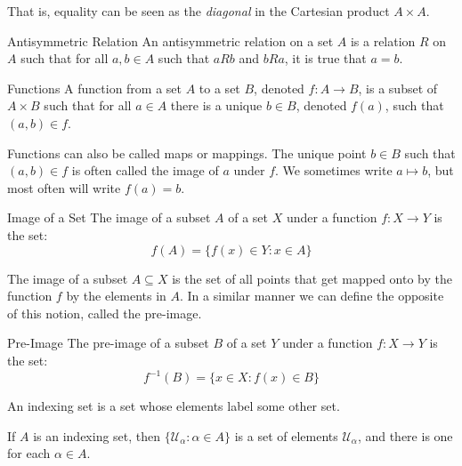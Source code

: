 \documentclass[crop=false,class=book,oneside]{standalone}
\begin{document}
        That is, equality can be seen as the \textit{diagonal} in the
        Cartesian product $A\times{A}$.
        \begin{ldefinition}{Antisymmetric Relation}
            An antisymmetric relation on a set $A$ is a relation $R$ on $A$
            such that for all $a,b\in{A}$ such that $aRb$ and $bRa$, it
            is true that $a=b$.
        \end{ldefinition}
        \begin{ldefinition}{Functions}
            A function from a set $A$ to a set $B$, denoted
            $f:A\rightarrow B$, is a subset of $A\times{B}$
            such that for all $a\in{A}$ there is a unique
            $b\in{B}$, denoted $f(a)$, such that $(a,b)\in{f}$.
        \end{ldefinition}
        Functions can also be called maps or mappings. The unique point
        $b\in{B}$ such that $(a,b)\in{f}$ is often called the image of
        $a$ under $f$. We sometimes write $a\mapsto{b}$, but most often
        will write $f(a)=b$.
        \begin{ldefinition}{Image of a Set}
            The image of a subset $A$ of a set $X$ under a function
            $f:X\rightarrow{Y}$ is the set:
            \begin{equation}
                f(A)=\{f(x)\in{Y}:x\in{A}\}
            \end{equation}
        \end{ldefinition}
        The image of a subset $A\subseteq{X}$ is the set of all points
        that get mapped onto by the function $f$ by the elements in $A$.
        In a similar manner we can define the opposite of this notion,
        called the pre-image.
        \begin{ldefinition}{Pre-Image}
            The pre-image of a subset $B$ of a set $Y$ under a function
            $f:X\rightarrow{Y}$ is the set:
            \begin{equation}
                f^{-1}(B)=\{x\in{X}:f(x)\in{B}\}
            \end{equation}
        \end{ldefinition}
        \begin{definition}
            An indexing set is a set whose elements label some other set.
        \end{definition}
        \begin{example}
            If $A$ is an indexing set, then $\{\mathcal{U}_{\alpha}:\alpha\in{A}\}$
            is a set of elements $\mathcal{U}_{\alpha}$, and there is one for each $\alpha\in{A}$.
        \end{example}
\end{document}
